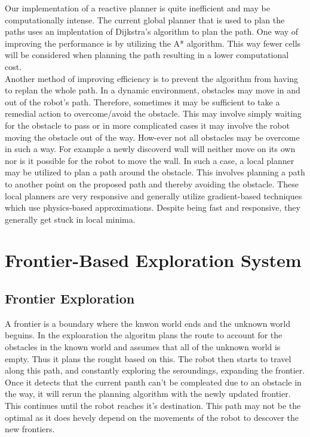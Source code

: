 \documentclass[a4paper,12pt]{article}
\begin{document}
			Our implementation of a reactive planner is quite inefficient and may be computationally intense. The current global planner that is used to plan the paths uses an implentation of Dijkstra's algorithm to plan the path. One way of improving the performance is by utilizing the A* algorithm. This way fewer cells will be considered when planning the path resulting in a lower computational cost.
			\\
			Another method of improving efficiency is to prevent the algorithm from having to replan the whole path. In a dynamic environment, obstacles may move in and out of the robot's path. Therefore, sometimes it may be sufficient to take a remedial action to overcome/avoid the obstacle. This may involve simply waiting for the obstacle to pass or in more complicated cases it may involve the robot moving the obstacle out of the way. How-ever not all obstacles may be overcome in such a way. For example a newly discoverd wall will neither move on its own nor is it possible for the robot to move the wall. In such a case, a local planner may be utilized to plan a path around the obstacle. This involves planning a path to another point on the proposed path and thereby avoiding the obstacle. These local planners are very responsive and generally utilize gradient-based techniques which use physics-based approximations. Despite being fast and responsive, they generally get stuck in local minima. 
			
	
	\section{Frontier-Based Exploration System}
	\subsection{Frontier Exploration}

			A frontier is a boundary where the knwon world ends and the unknown world beguins.
			In the exploaration the algoritm plans the route to account for the obstacles in the known world
			and assumes that all of the unknown world is empty. Thus it plans the rought based on this.
			The robot then starts to travel along this path, and constantly exploring the seroundings, expanding the frontier.
			Once it detects that the current panth can't be compleated due to an obstacle in the way, it will rerun the
			planning algorithm with the newly updated frontier. This continues until the robot reaches it's destination.
			This path may not be the optimal as it does hevely depend on the movements of the robot to descover the new frontiers.
\end{document}
